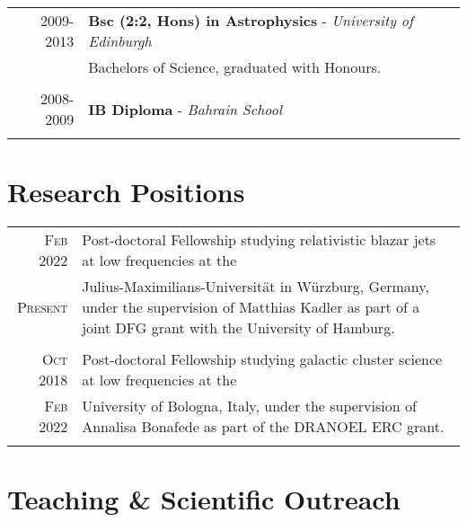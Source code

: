 \documentclass[10pt]{article} %
\begin{document}
\begin{tabular}{r|p{12.5cm}}
\textsc{2009-2013} & \textbf{Bsc (2:2, Hons) in Astrophysics} - \textit{University of Edinburgh} \\
& Bachelors of Science, graduated with Honours.\\
\multicolumn{2}{c}{} \\

\textsc{2008-2009} & \textbf{IB Diploma} - \textit{Bahrain School} \\
\multicolumn{2}{c}{} \\

\end{tabular}


\section{Research Positions}

\begin{tabular}{r|p{12.5cm}}
	\textsc{Feb 2022} & Post-doctoral Fellowship studying relativistic blazar jets at low frequencies at the\\
	\textsc{Present}& Julius-Maximilians-Universit{\"a}t in W{\"u}rzburg, Germany, under the supervision of Matthias Kadler as part of a joint DFG grant with the University of Hamburg.\\
	\multicolumn{2}{c}{} \\
	\textsc{Oct 2018} & Post-doctoral Fellowship studying galactic cluster science at low frequencies at the\\
	\textsc{Feb 2022}& University of Bologna, Italy, under the supervision of Annalisa Bonafede as part of the
	DRANOEL ERC grant.\\
	\multicolumn{2}{c}{} \\
\end{tabular}

\section{Teaching \& Scientific Outreach}
\end{document}
